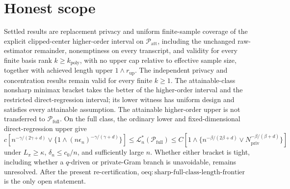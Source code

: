 \documentclass{article}
\begin{document}
\section{Honest scope}

Settled results are replacement privacy and uniform finite-sample coverage of the explicit clipped-center higher-order interval on \(\mathcal P_{\mathrm{att}}\), including the unchanged raw-estimator remainder, nonemptiness on every transcript, and validity for every finite basis rank \(k\ge k_{\mathrm{poly}}\), with no upper cap relative to effective sample size, together with achieved length upper \(1\wedge r_{\mathrm{up}}\).  The independent privacy and concentration results remain valid for every finite \(k\ge1\).  The attainable-class nonsharp minimax bracket takes the better of the higher-order interval and the restricted direct-regression interval; its lower witness has uniform design and satisfies every attainable assumption.  The attainable higher-order upper is not transferred to \(\mathcal P_{\mathrm{full}}\).  On the full class, the ordinary lower and fixed-dimensional direct-regression upper give \(c[n^{-\gamma/(2\gamma+d)}\vee\{1\wedge(n\epsilon_n)^{-\gamma/(\gamma+d)}\}]\le\mathcal L_n^*(\mathcal P_{\mathrm{full}})\le C[1\wedge\{n^{-\beta/(2\beta+d)}\vee N_{\mathrm{priv}}^{-\beta/(\beta+d)}\}]\) under \(L_\pi\ge\kappa\), \(\delta_n\le c_0/n\), and sufficiently large \(n\).  Whether either bracket is tight, including whether a \(q\)-driven or private-Gram branch is unavoidable, remains unresolved.  After the present re-certification, \(\mathrm{oeq{:}sharp\text{-}full\text{-}class\text{-}length\text{-}frontier}\) is the only open statement.
\end{document}

